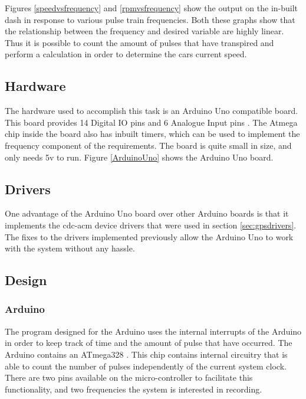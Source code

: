 
Figures \ref{speedvsfrequency} and \ref{rpmvsfrequency} show the output on the in-built dash in response to various pulse train frequencies. Both these graphs show that the relationship between the frequency and desired variable are highly linear. Thus it is possible to count the amount of pulses that have transpired and perform a calculation in order to determine the cars current speed.

\subsection{Hardware}

The hardware used to accomplish this task is an Arduino Uno compatible board. This board provides 14 Digital IO pins and 6 Analogue Input pins \cite{arduinospecs}. The Atmega chip inside the board also has inbuilt timers, which can be used to implement the frequency component of the requirements. The board is quite small in size, and only needs 5v to run. Figure \ref{ArduinoUno} shows the Arduino Uno board.


\subsection{ Drivers}

One advantage of the Arduino Uno board over other Arduino boards is that it implements the cdc-acm device drivers that were used in section \ref{sec:gpsdrivers}. The fixes to the drivers implemented previously allow the Arduino Uno to work with the system without any hassle. 

\subsection {Design}

\subsubsection{Arduino}

The program designed for the Arduino uses the internal interrupts of the Arduino in order to keep track of time and the amount of pulse that have occurred. The Arduino contains an ATmega328 \cite{arduinospecs}. This chip contains internal circuitry that is able to count the number of pulses independently of the current system clock. There are two pins available on the micro-controller to facilitate this functionality, and two frequencies the system is interested in recording.

